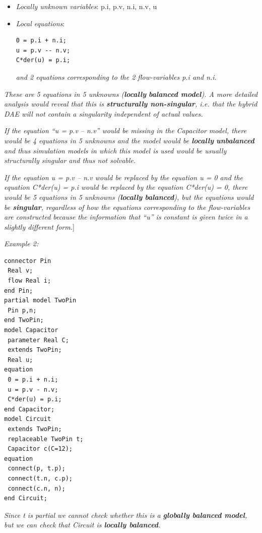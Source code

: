 \documentclass[10pt,a4paper]{report}
\def\Mcommentend#1{\emph{#1}{]}}
\def\Mcommentmid#1{\emph{#1}}
\begin{document}
\begin{itemize}
\item \Mcommentmid{Locally unknown variables}: p.i, p.v, n.i, n.v, u
\item \Mcommentmid{Local equations}: 
\begin{lstlisting}[language=modelica]
0 = p.i + n.i;
u = p.v -- n.v;
C*der(u) = p.i;
\end{lstlisting}
\Mcommentmid{and 2 equations corresponding to the 2 flow-variables \emph{p.i}
and \emph{n.i}.}
\end{itemize}

\Mcommentmid{These are 5 equations in 5 unknowns (\textbf{locally}
\textbf{balanced model}). A more detailed analysis would reveal that
this is \textbf{structurally non-singular}, i.e. that the hybrid DAE
will not contain a singularity independent of actual values.}

\Mcommentmid{If the equation ``u = p.v -- n.v'' would be missing in the
Capacitor model, there would be 4 equations in 5 unknowns and the model
would be \textbf{locally} \textbf{unbalanced} and thus simulation models
in which this model is used would be usually structurally singular and
thus not solvable.}

\Mcommentend{If the equation \emph{u = p.v -- n.v} would be replaced by the
equation \emph{u = 0} and the equation \emph{C*der(u) = p.i} would
be replaced by the equation \emph{C*der(u) = 0}, there would be 5
equations in 5 unknowns (\textbf{locally} \textbf{balanced}), but the
equations would be \textbf{singular}, regardless of how the equations
corresponding to the flow-variables are constructed because the
information that ``u'' is constant is given twice in a slightly
different form.}

\Mcommentmid{Example 2:}

\begin{lstlisting}[language=modelica]
connector Pin
 Real v;
 flow Real i;
end Pin;
partial model TwoPin
 Pin p,n;
end TwoPin;
model Capacitor
 parameter Real C;
 extends TwoPin;
 Real u;
equation
 0 = p.i + n.i;
 u = p.v - n.v;
 C*der(u) = p.i;
end Capacitor;
model Circuit
 extends TwoPin;
 replaceable TwoPin t;
 Capacitor c(C=12);
equation
 connect(p, t.p);
 connect(t.n, c.p);
 connect(c.n, n);
end Circuit;
\end{lstlisting}

\Mcommentmid{Since t is partial we cannot check whether this is a
\textbf{globally balanced model}, but we can check that \emph{Circuit}
is \textbf{locally balanced}.}
\end{document}
